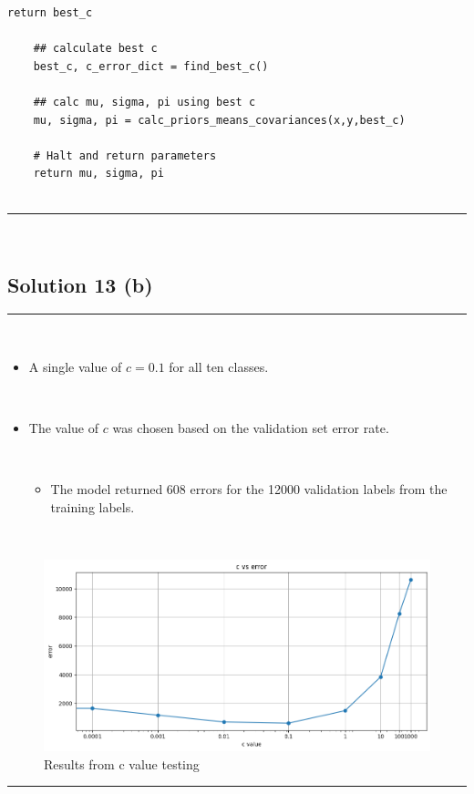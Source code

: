 \documentclass{article}
\begin{document}
\begin{lstlisting}[style=pythonstyle]
        return best_c

    ## calculate best c
    best_c, c_error_dict = find_best_c()
    
    ## calc mu, sigma, pi using best c
    mu, sigma, pi = calc_priors_means_covariances(x,y,best_c)

    # Halt and return parameters
    return mu, sigma, pi
    
\end{lstlisting}
\noindent\rule{\textwidth}{0.4pt}\\
\newpage
\subsection*{Solution 13 (b)}
\noindent\rule{\textwidth}{0.4pt}\\
\begin{itemize}
    \item \parbox{\textwidth}{A single value of $c=0.1$ for all ten classes.}\\
    \item \parbox{\textwidth}{The value of $c$ was chosen based on the validation set error rate.}\\
    \begin{itemize}
        \item \parbox{\textwidth}{The model returned 608 errors for the 12000 validation labels from the training labels.}\\
    \end{itemize}
\end{itemize}

\begin{figure}[H]
\includegraphics[width=1\textwidth]{hw3_13_b.png} 
\caption{Results from c value testing}
\end{figure}
\noindent\rule{\textwidth}{0.4pt}\\
\end{document}
